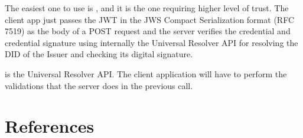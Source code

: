 \documentclass[a4paper,12pt,english]{sphinxhowto}
\begin{document}
\sphinxAtStartPar
The easiest one to use is , and it is the one requiring higher level of trust. The client app just passes the JWT in the JWS Compact Serialization format (RFC 7519) as the body of a POST request and the server verifies the credential and credential signature using internally the Universal Resolver API for resolving the DID of the Issuer and checking its digital signature.

\sphinxAtStartPar
{} is the Universal Resolver API. The client application will have to perform the validations that the server does in the previous call.


\section{References}
\label{\detokenize{ssi/references:references}}\label{\detokenize{ssi/references::doc}}\label{\detokenize{ssi/references:id1}}


\renewcommand{\indexname}{Index}
\printindex
\end{document}
